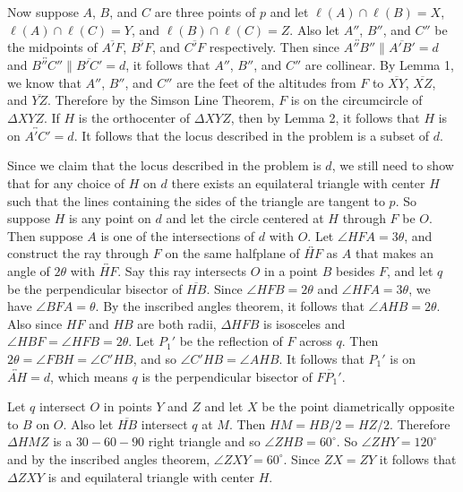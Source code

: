 \begin{enumerate}
 Now suppose $A$, $B$, and $C$ are three points of $p$ and let $\ell(A)\cap\ell(B)=X$, $\ell(A)\cap\ell(C)=Y$, and $\ell(B)\cap\ell(C)=Z$. Also let $A''$, $B''$, and $C''$ be the midpoints of $\overline{A'F}$, $\overline{B'F}$, and $\overline{C'F}$ respectively. Then since $\overleftrightarrow{A''B''}\parallel \overline{A'B'}=d$ and $\overleftrightarrow{B''C''}\parallel \overline{B'C'}=d$, it follows that $A''$, $B''$, and $C''$ are collinear. By Lemma 1, we know that $A''$, $B''$, and $C''$ are the feet of the altitudes from $F$ to $\overline{XY}$, $\overline{XZ}$, and $\overline{YZ}$. Therefore by the Simson Line Theorem, $F$ is on the circumcircle of $\Delta XYZ$. If $H$ is the orthocenter of $\Delta XYZ$, then by Lemma 2, it follows that $H$ is on $\overleftrightarrow{A'C'}=d$. It follows that the locus described in the problem is a subset of $d$.

 Since we claim that the locus described in the problem is $d$, we still need to show that for any choice of $H$ on $d$ there exists an equilateral triangle with center $H$ such that the lines containing the sides of the triangle are tangent to $p$. So suppose $H$ is any point on $d$ and let the circle centered at $H$ through $F$ be $O$. Then suppose $A$ is one of the intersections of $d$ with $O$. Let $\angle HFA=3\theta$, and construct the ray through $F$ on the same halfplane of $\overleftrightarrow{HF}$ as $A$ that makes an angle of $2\theta$ with $\overleftrightarrow{HF}$. Say this ray intersects $O$ in a point $B$ besides $F$, and let $q$ be the perpendicular bisector of $\overline{HB}$. Since $\angle HFB=2\theta$ and $\angle HFA=3\theta$, we have $\angle BFA=\theta$. By the inscribed angles theorem, it follows that $\angle AHB=2\theta$. Also since $HF$ and $HB$ are both radii, $\Delta HFB$ is isosceles and $\angle HBF=\angle HFB=2\theta$. Let $P_1'$ be the reflection of $F$ across $q$. Then $2\theta=\angle FBH=\angle C'HB$, and so $\angle C'HB=\angle AHB$. It follows that $P_1'$ is on $\overleftrightarrow{AH}=d$, which means $q$ is the perpendicular bisector of $\overline{FP_1'}$.

 Let $q$ intersect $O$ in points $Y$ and $Z$ and let $X$ be the point diametrically opposite to $B$ on $O$. Also let $\overline{HB}$ intersect $q$ at $M$. Then $HM=HB/2=HZ/2$. Therefore $\Delta HMZ$ is a $30-60-90$ right triangle and so $\angle ZHB=60^{\circ}$. So $\angle ZHY=120^{\circ}$ and by the inscribed angles theorem, $\angle ZXY=60^{\circ}$. Since $ZX=ZY$ it follows that $\Delta ZXY$ is and equilateral triangle with center $H$.


\end{enumerate}
